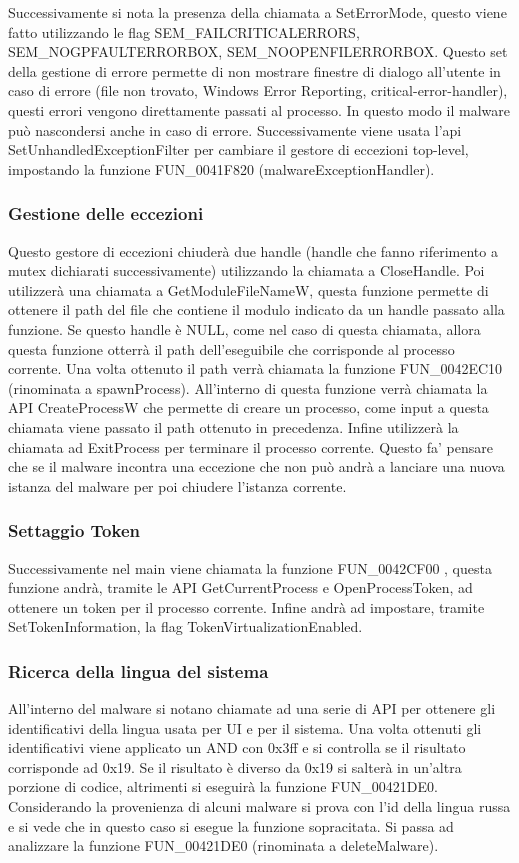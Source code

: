 \documentclass[a4paper,12pt]{article}
\begin{document}
Successivamente si nota la presenza della chiamata a SetErrorMode, questo viene fatto utilizzando le flag SEM\_FAILCRITICALERRORS,\\ SEM\_NOGPFAULTERRORBOX, SEM\_NOOPENFILERRORBOX. Questo set della gestione di errore permette di non mostrare finestre di dialogo all'utente in caso di errore (file non trovato, Windows Error Reporting, critical-error-handler), questi errori vengono direttamente passati al processo. In questo modo il malware può nascondersi anche in caso di errore. Successivamente viene usata l'api SetUnhandledExceptionFilter per cambiare il gestore di eccezioni top-level, impostando la funzione FUN\_0041F820 (malwareExceptionHandler). 

\subsubsection{Gestione delle eccezioni}
Questo gestore di eccezioni chiuderà due handle (handle che fanno riferimento a mutex dichiarati successivamente) utilizzando la chiamata a CloseHandle. Poi utilizzerà una chiamata a GetModuleFileNameW, questa funzione permette di ottenere il path del file che contiene il modulo indicato da un handle passato alla funzione. Se questo handle è NULL, come nel caso di questa chiamata, allora questa funzione otterrà il path dell'eseguibile che corrisponde al processo corrente. Una volta ottenuto il path verrà chiamata la funzione FUN\_0042EC10 (rinominata a spawnProcess). All'interno di questa funzione verrà chiamata la API CreateProcessW che permette di creare un processo, come input a questa chiamata viene passato il path ottenuto in precedenza. Infine utilizzerà la chiamata ad ExitProcess per terminare il processo corrente. Questo fa' pensare che se il malware incontra una eccezione che non può andrà a lanciare una nuova istanza del malware per poi chiudere l'istanza corrente.

\subsubsection{Settaggio Token}
Successivamente nel main viene chiamata la funzione FUN\_0042CF00 , questa funzione andrà, tramite le API GetCurrentProcess e OpenProcessToken, ad ottenere un token per il processo corrente. Infine andrà ad impostare, tramite SetTokenInformation, la flag TokenVirtualizationEnabled.

\subsubsection{Ricerca della lingua del sistema}
All'interno del malware si notano chiamate ad una serie di API per ottenere gli identificativi della lingua usata per UI e per il sistema. Una volta ottenuti gli identificativi viene applicato un AND con 0x3ff e si controlla se il risultato corrisponde ad 0x19. Se il risultato è diverso da 0x19 si salterà in un'altra porzione di codice, altrimenti si eseguirà la funzione FUN\_00421DE0.
Considerando la provenienza di alcuni malware si prova con l'id della lingua russa e si vede che in questo caso si esegue la funzione sopracitata. Si passa ad analizzare la funzione FUN\_00421DE0 (rinominata a deleteMalware). 
\end{document}
